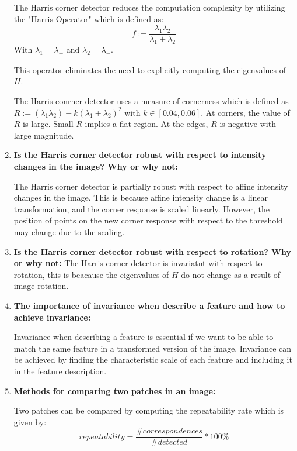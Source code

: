 \documentclass[a4paper]{article}
\begin{document}
\begin{enumerate}
        The Harris corner detector reduces the computation complexity by utilizing the "Harris Operator" which is defined as:
        $$f:= \frac{\lambda_{1} \lambda_{2}}{\lambda_{1} + \lambda_{2}}$$ 
        With $\lambda_{1}= \lambda_{+}$ and $\lambda_{2}= \lambda_{-}$. 

        This operator eliminates the need to explicitly computing the eigenvalues of $H$.  

        The Harris conrner detector uses a measure of cornerness which is defined as $R:= (\lambda_{1} \lambda_{2}) -k{(\lambda_{1} + \lambda_{2})}^{2}$ with $k \in [0.04, 0.06]$. 
        At corners, the value of $R$ is large. Small $R$ implies a flat region. At the edges, $R$ is negative with large magnitude. 

        \item \textbf{Is the Harris corner detector robust with respect to intensity changes in the image? Why or
        why not:}

        The Harris corner detector is partially robust with respect to affine intensity changes in the image. 
        This is because affine intensity change is a linear transformation, and the corner response is scaled linearly. 
        However, the position of points on the new corner response with respect to the threshold may change due to the scaling.   

        \item \textbf{Is the Harris corner detector robust with respect to rotation? Why or why not:}
        The Harris corner detector is invariatnt with respect to rotation, this is beacause the eigenvalues of $H$ do not change as a result of image rotation.  
        
        \item \textbf{The importance of invariance when describe a feature and how to achieve
        invariance:}

        Invariance when describing a feature is essential if we want to be able to match the same feature in a transformed version of the image.  
        Invariance can be achieved by finding the characteristic scale of each feature and including it in the feature description.  

        \item \textbf{Methods for comparing two patches in an image:}
        
        Two patches can be compared by computing the repeatability rate which is given by: 
        $$ repeatability= \frac{\#correspondences}{\#detected} * 100\%  $$
        

\end{enumerate}
\end{document}
